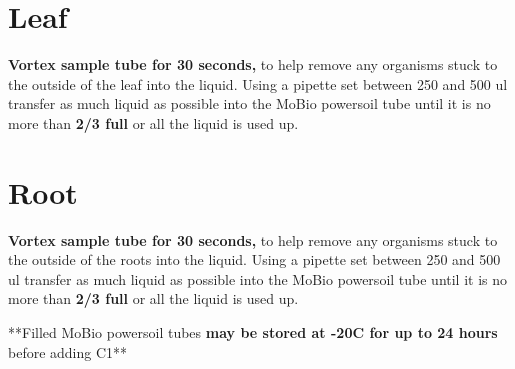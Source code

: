 \documentclass[a4paper,12pt]{article} %
\begin{document}

\section{Leaf}

\textbf{Vortex sample tube for 30 seconds,} to help remove any organisms stuck to the outside of the leaf into the liquid. Using a pipette set between 250 and 500 ul transfer as much liquid as possible into the MoBio powersoil tube until it is no more than \textbf{2/3 full} or all the liquid is used up.


\section{Root}

\textbf{Vortex sample tube for 30 seconds,} to help remove any organisms stuck to the outside of the roots into the liquid. Using a pipette set between 250 and 500 ul transfer as much liquid as possible into the MoBio powersoil tube until it is no more than \textbf{2/3 full} or all the liquid is used up.


**Filled MoBio powersoil tubes \textbf{may be stored at -20\degree C for up to 24 hours} before adding C1**



\end{document}
